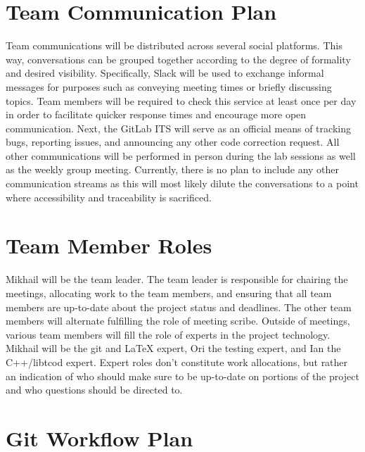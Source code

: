 \documentclass{article}
\begin{document}
\section{Team Communication Plan}

Team communications will be distributed across several social platforms. This way, conversations can be grouped together according to the degree of formality and desired visibility.  Specifically, Slack will be used to exchange informal messages for purposes such as conveying meeting times or briefly discussing topics.  Team members will be required to check this service at least once per day in order to facilitate quicker response times and encourage more open communication.  Next, the GitLab ITS will serve as an official means of tracking bugs, reporting issues, and announcing any other code correction request.  All other communications will be performed in person during the lab sessions as well as the weekly group meeting.  Currently, there is no plan to include any other communication streams as this will most likely dilute the conversations to a point where accessibility and traceability is sacrificed.

\section{Team Member Roles}

Mikhail will be the team leader. The team leader is responsible for chairing the meetings, allocating work to the team members, and ensuring that all team members are up-to-date about the project status and deadlines. The other team members will alternate fulfilling the role of meeting scribe. Outside of meetings, various team members will fill the role of experts in the project technology. Mikhail will be the git and LaTeX expert, Ori the testing expert, and Ian the C++/libtcod expert. Expert roles don't constitute work allocations, but rather an indication of who should make sure to be up-to-date on portions of the project and who questions should be directed to.

\section{Git Workflow Plan}
\end{document}
